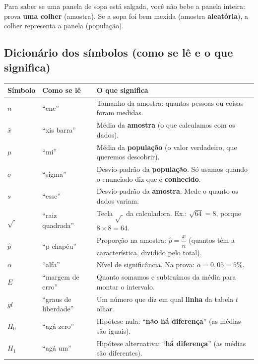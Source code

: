 \documentclass[12pt,a4paper]{article}
\begin{document}
\begin{tcolorbox}[colback=laranja!6,colframe=laranja,title=Analogia da sopa]
Para saber se uma panela de sopa está salgada, você não bebe a panela inteira: prova \textbf{uma colher} (amostra). Se a sopa foi bem mexida (amostra \textbf{aleatória}), a colher representa a panela (população).
\end{tcolorbox}

\subsection*{Dicionário dos símbolos (como se lê e o que significa)}
\renewcommand{\arraystretch}{1.35}
\begin{center}
\begin{tabular}{>{\centering\arraybackslash}m{1.6cm} m{3.2cm} m{10cm}}
\toprule
\textbf{Símbolo} & \textbf{Como se lê} & \textbf{O que significa} \\
\midrule
$n$ & ``ene'' & Tamanho da amostra: quantas pessoas ou coisas foram medidas. \\
$\bar{x}$ & ``xis barra'' & Média da \textbf{amostra} (o que calculamos com os dados). \\
$\mu$ & ``mi'' & Média da \textbf{população} (o valor verdadeiro, que queremos descobrir). \\
$\sigma$ & ``sigma'' & Desvio-padrão da \textbf{população}. Só usamos quando o enunciado diz que é \textbf{conhecido}. \\
$s$ & ``esse'' & Desvio-padrão da \textbf{amostra}. Mede o quanto os dados variam. \\
$\sqrt{\ }$ & ``raiz quadrada'' & Tecla $\sqrt{\ }$ da calculadora. Ex.: $\sqrt{64}=8$, porque $8\times 8=64$. \\
$\hat{p}$ & ``p chapéu'' & Proporção na amostra: $\hat{p}=\dfrac{x}{n}$ (quantos têm a característica, dividido pelo total). \\
$\alpha$ & ``alfa'' & Nível de significância. Na prova: $\alpha = 0,05 = 5\%$. \\
$E$ & ``margem de erro'' & Quanto somamos e subtraímos da média para montar o intervalo. \\
$gl$ & ``graus de liberdade'' & Um número que diz em qual \textbf{linha} da tabela $t$ olhar. \\
$H_0$ & ``agá zero'' & Hipótese nula: ``\textbf{não há diferença}'' (as médias são iguais). \\
$H_1$ & ``agá um'' & Hipótese alternativa: ``\textbf{há diferença}'' (as médias são diferentes). \\
\bottomrule
\end{tabular}
\end{center}
\end{document}
